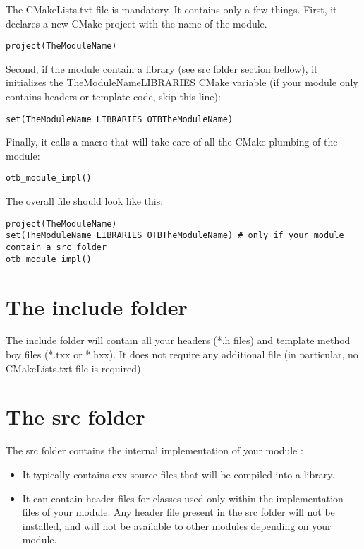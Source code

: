 The CMakeLists.txt file is mandatory. It contains only a few things.
First, it declares a new CMake project with the name of the module. 

\begin{verbatim}
project(TheModuleName)
\end{verbatim}

Second, if the module contain a library (see src folder section bellow), it initializes the TheModuleName\textunderscore LIBRARIES CMake variable (if your module only contains headers or template code, skip this line): 

\begin{verbatim}
set(TheModuleName_LIBRARIES OTBTheModuleName)
\end{verbatim}

Finally, it calls a macro that will take care of all the CMake plumbing of the module: 

\begin{verbatim}
otb_module_impl()
\end{verbatim}

The overall file should look like this:
 
\begin{verbatim}
project(TheModuleName)
set(TheModuleName_LIBRARIES OTBTheModuleName) # only if your module contain a src folder
otb_module_impl()
\end{verbatim}

\section{The include folder}

The include folder will contain all your headers (*.h files) and template method boy files (*.txx or *.hxx). It does not require any additional file (in particular, no CMakeLists.txt file is required). 

\section{The src folder }

The src folder contains the internal implementation of your module : 

\begin{itemize}
       \item  It typically contains cxx source files that will be compiled into a library.  
       \item  It can contain header files for classes used only within the implementation files of your module. Any header file present in the src folder will not be installed, and will not be available to other modules depending on your module.
\end{itemize}


